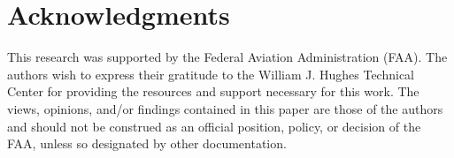 \section*{Acknowledgments}

This research was supported by the Federal Aviation Administration (FAA). The authors wish to express their gratitude to the William J. Hughes Technical Center for providing the resources and support necessary for this work. The views, opinions, and/or findings contained in this paper are those of the authors and should not be construed as an official position, policy, or decision of the FAA, unless so designated by other documentation.